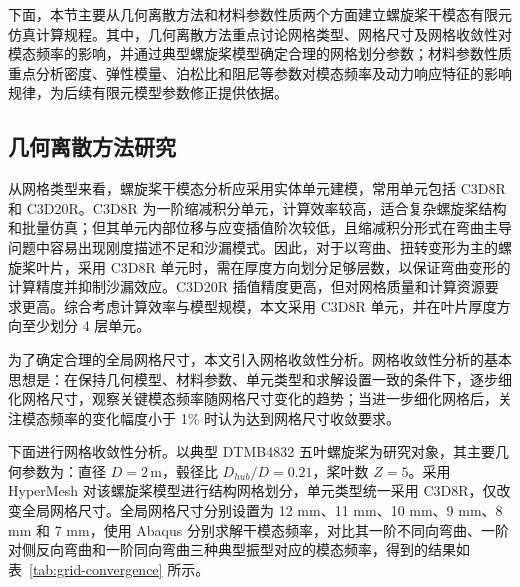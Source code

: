 下面，本节主要从几何离散方法和材料参数性质两个方面建立螺旋桨干模态有限元仿真计算规程。其中，几何离散方法重点讨论网格类型、网格尺寸及网格收敛性对模态频率的影响，并通过典型螺旋桨模型确定合理的网格划分参数；材料参数性质重点分析密度、弹性模量、泊松比和阻尼等参数对模态频率及动力响应特征的影响规律，为后续有限元模型参数修正提供依据。

\subsection{几何离散方法研究}

从网格类型来看，螺旋桨干模态分析应采用实体单元建模，常用单元包括 C3D8R 和 C3D20R。C3D8R 为一阶缩减积分单元，计算效率较高，适合复杂螺旋桨结构和批量仿真；但其单元内部位移与应变插值阶次较低，且缩减积分形式在弯曲主导问题中容易出现刚度描述不足和沙漏模式。因此，对于以弯曲、扭转变形为主的螺旋桨叶片，采用 C3D8R 单元时，需在厚度方向划分足够层数，以保证弯曲变形的计算精度并抑制沙漏效应。C3D20R 插值精度更高，但对网格质量和计算资源要求更高。综合考虑计算效率与模型规模，本文采用 C3D8R 单元，并在叶片厚度方向至少划分 4 层单元。

为了确定合理的全局网格尺寸，本文引入网格收敛性分析。网格收敛性分析的基本思想是：在保持几何模型、材料参数、单元类型和求解设置一致的条件下，逐步细化网格尺寸，观察关键模态频率随网格尺寸变化的趋势；当进一步细化网格后，关注模态频率的变化幅度小于 1\% 时认为达到网格尺寸收敛要求。

下面进行网格收敛性分析。以典型 DTMB4832 五叶螺旋桨为研究对象，其主要几何参数为：直径 $D=2\,\mathrm{m}$，毂径比 $D_{hub}/D=0.21$，桨叶数 $Z=5$。采用 HyperMesh 对该螺旋桨模型进行结构网格划分，单元类型统一采用 C3D8R，仅改变全局网格尺寸。全局网格尺寸分别设置为 12 mm、11 mm、10 mm、9 mm、8 mm 和 7 mm，使用 Abaqus 分别求解干模态频率，对比其一阶不同向弯曲、一阶对侧反向弯曲和一阶同向弯曲三种典型振型对应的模态频率，得到的结果如表~\ref{tab:grid-convergence} 所示。

